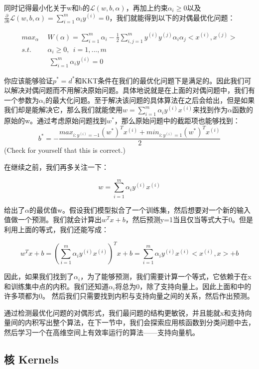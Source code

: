 \documentclass[UTF8]{ctexart}
\begin{document}
同时记得最小化关于w和b的$\mathcal{L}(w,b,\alpha)$，再加上约束$\alpha_{i}\geq0$以及$\frac{\partial}{\partial{b}} \mathcal{L}(w,b,\alpha)  = \sum_{i=1}^{m} \alpha_{i}y^{(i)} = 0$，我们就能得到以下的对偶最优化问题：


\begin{align*}
max_{\alpha} & \ \ W(\alpha) = \sum_{i=1}^{m} \alpha_{i} - \frac{1}{2} \sum_{i,j=1}^{m}y^{(i)}y^{(j)}\alpha_{i}\alpha_{j}<x^{(i)},x^{(j)}> \\
s.t. & \ \ \alpha_{i}\geq0,\ \ i=1,...,m \\
\ & \ \ \ \sum_{i=1}^{m}\alpha_{i}y^{(i)} = 0
\end{align*}


你应该能够验证$p^{*}=d^{*}$和KKT条件在我们的最优化问题下是满足的。因此我们可以解决对偶问题而不用解决原始问题。具体地说就是在上面的对偶问题中，我们有一个参数为$\alpha_{i}$的最大化问题。至于解决该问题的具体算法在之后会给出，但是如果我们却是能解决它，那么我们就能使用$ w = \sum_{i=1}^{m} \alpha_{i}y^{(i)}x^{(i)}$来找到作为$\alpha$函数的原始的w。通过考虑原始问题找到$w^{*}$，那么原始问题中的截距项也能够找到：
\[ b^{*} = -  \frac{   max_{i:y^{(i)}=-1} (w^{*})^{T}x^{(i)} + min_{i:y^{(i)}=1} (w^{*})^{T}x^{(i)}     }{  2    }  \]
(Check for yourself that this is correct.)

在继续之前，我们再多关注一下：

\[ w = \sum_{i=1}^{m} \alpha_{i}y^{(i)}x^{(i)} \]

给出了$\alpha$的最优值w。假设我们模型拟合了一个训练集，然后想要对一个新的输入值做一个预测。我们就会计算出$w^{T}x+b$，然后预测y=1当且仅当等式大于0。但是利用上面的等式，我们还能写成：

\[ w^{T}x+b = (\sum_{i=1}^{m} \alpha_{i}y^{(i)}x^{(i)} )^{T}x +b = \sum_{i=1}^{m}  \alpha_{i}y^{(i)}x^{(i)}<x^{(i)},x> + b \]

因此，如果我们找到了$\alpha_{i}$，为了能够预测，我们需要计算一个等式，它依赖于在x和训练集中点的内积。我们还知道$\alpha_{i}$将总为0，除了支持向量上。因此上面和中的许多项都为0。
然后我们只需要找到内积与支持向量之间的关系，然后作出预测。

通过检测最优化问题的对偶形式，我们最问题的结构更敏锐，并且能就x和支持向量间的内积写出整个算法，在下一节中，我们会探索应用核函数到分类问题中去，然后学习一个在高维空间上有效率运行的算法——支持向量机。


\subsection{核 Kernels}
\end{document}
